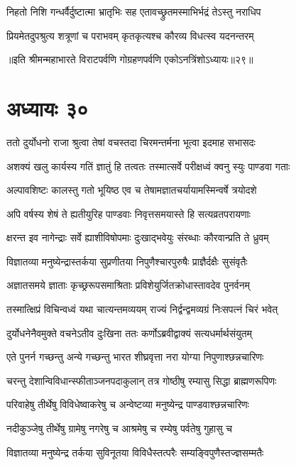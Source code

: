 \twolineshloka
{निहतो निशि गन्धर्वैर्दुष्टात्मा भ्रातृभिः सह}
{एतावच्छ्रुतमस्माभिर्भद्रं तेऽस्तु नराधिप}


\twolineshloka
{प्रियमेतदुपश्रुत्य शत्रूणां च पराभवम्}
{कृतकृत्यश्च कौरव्य विधत्स्व यदनन्तरम्}

॥इति श्रीमन्महाभारते विराटपर्वणि गोग्रहणपर्वणि एकोऽनत्रिंशोऽध्यायः॥२९॥

\chapter{अध्यायः ३०}

\twolineshloka
{ततो दुर्योधनो राजा श्रुत्वा तेषां वचस्तदा}
{चिरमन्तर्मना भूत्वा इदमाह सभासदः}


\twolineshloka
{अशक्यं खलु कार्यस्य गतिं ज्ञातुं हि तत्वतः}
{तस्मात्सर्वे परीक्षध्वं क्वनु स्युः पाण्डवा गताः}


\twolineshloka
{अल्पावशिष्टः कालस्तु गतो भूयिष्ठ एव च}
{तेषामज्ञातचर्यायामस्मिन्वर्षे त्रयोदशे}


\twolineshloka
{अपि वर्षस्य शेषं ते ह्यतीयुरिह पाण्डवाः}
{निवृत्तसमयास्ते हि सत्यव्रतपरायणाः}


\twolineshloka
{क्षरन्त इव नागेन्द्राः सर्वे ह्याशीविषोपमाः}
{दुःखाद्भवेयुः संरब्धाः कौरवान्प्रति ते ध्रुवम्}


\twolineshloka
{विज्ञातव्या मनुष्येन्द्रास्तर्कया सुप्रणीतया}
{निपुणैश्चारपुरुषैः प्राज्ञैर्दक्षैः सुसंवृतैः}


\twolineshloka
{अज्ञातसमये ज्ञाताः कृच्छ्ररूपसमाश्रिताः}
{प्रविशेयुर्जितक्रोधास्तावदेव पुनर्वनम्}


\twolineshloka
{तस्मात्क्षिप्रं विचिन्वध्वं यथा चात्यन्तमव्ययम्}
{राज्यं निर्द्वन्द्वमव्यग्रं निःसपत्नं चिरं भवेत्}


\twolineshloka
{दुर्योधनेनैवमुक्ते वचनेऽतीव दुःखिना}
{ततः कर्णोऽब्रवीद्वाक्यं सत्यधर्मार्थसंयुतम्}


\twolineshloka
{एते पुनर्न गच्छन्तु अन्ये गच्छन्तु भारत}
{शीघ्रवृत्ता नरा योग्या निपुणाश्छन्नचारिणः}


\twolineshloka
{चरन्तु देशान्विविधान्स्फीताञ्जनपदाकुलान्}
{तत्र गोष्ठीषु रम्यासु सिद्धा ब्राह्मणरूपिणः}


\twolineshloka
{परिवाहेषु तीर्थेषु विविधेष्वाकरेषु च}
{अन्वेष्टव्या मनुष्येन्द्र पाण्डवाश्छन्नचारिणः}


\twolineshloka
{नदीकुञ्जेषु तीर्थेषु ग्रामेषु नगरेषु च}
{आश्रमेषु च रम्येषु पर्वतेषु गुहासु च}


\twolineshloka
{विज्ञातव्या मनुष्येन्द्र तर्कया सुविनूतया}
{विविधैस्तत्परैः सम्यङ्विपुणैस्तज्ज्ञसम्मतैः}


